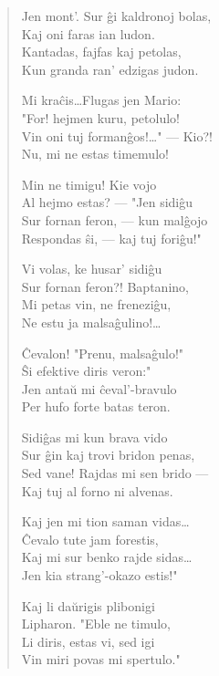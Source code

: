 \begin{verse}
                         \vin     Jen mont'. Sur \^gi kaldronoj bolas,\\
                         \vin     Kaj oni faras ian ludon.\\
                         \vin     Kantadas, fajfas kaj petolas,\\
                         \vin     Kun granda ran' edzigas judon.

                        Mi kra\^cis\dots Flugas jen Mario:\\
                        "For! hejmen kuru, petolulo!\\
                        Vin oni tuj forman\^gos!\dots" --- Kio?!\\
                        Nu, mi ne estas timemulo!

                        \vin      Min ne timigu! Kie vojo\\
                        \vin      Al hejmo estas? --- "Jen sidi\^gu\\
                         \vin     Sur fornan feron, --- kun mal\^gojo\\
                         \vin     Respondas \^si, --- kaj tuj fori\^gu!"

                        Vi volas, ke husar' sidi\^gu\\
                        Sur fornan feron?! Baptanino,\\
                        Mi petas vin, ne frenezi\^gu,\\
                        Ne estu ja malsa\^gulino!\dots

                         \vin     \^Cevalon! "Prenu, malsa\^gulo!"\\
                        \vin      \^Si efektive diris veron:"\\
                         \vin     Jen anta\u u mi \^ceval'-bravulo\\
                        \vin      Per hufo forte batas teron.

                        Sidi\^gas mi kun brava vido\\
                        Sur \^gin kaj trovi bridon penas,\\
                        Sed vane! Rajdas mi sen brido ---\\
                        Kaj tuj al forno ni alvenas.

                        \vin      Kaj jen mi tion saman vidas\dots\\
                        \vin      \^Cevalo tute jam forestis,\\
                        \vin      Kaj mi sur benko rajde sidas\dots\\
                         \vin     Jen kia strang'-okazo estis!"

                        Kaj li da\u urigis plibonigi\\
                        Lipharon. "Eble ne timulo,\\
                        Li diris, estas vi, sed igi\\
                        Vin miri povas mi spertulo."

\end{verse}


\smallrule{}
